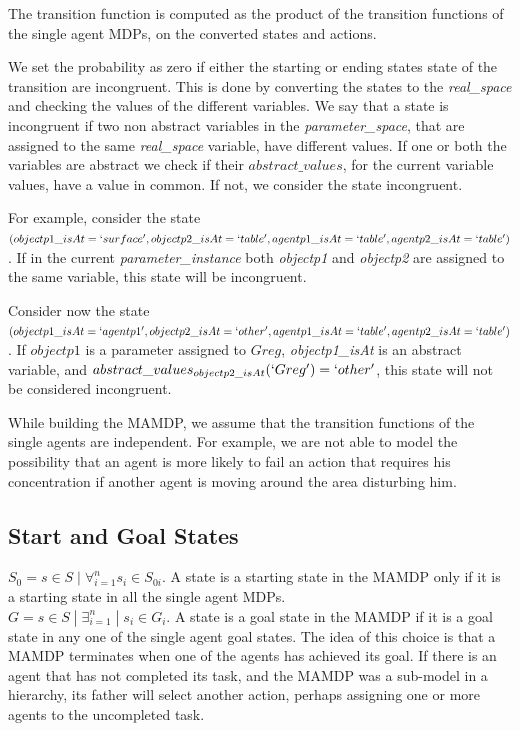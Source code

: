 The transition function is computed as the product of the transition functions of the single agent MDPs, on the converted states and actions.

We set the probability as zero if either the starting or ending states state of the transition are incongruent. This is done by converting the states to the \textit{real\_space} and checking the values of the different variables. We say that a state is incongruent if two non abstract variables in the \textit{parameter\_space}, that are assigned to the same \textit{real\_space} variable, have different values. If one or both the variables are abstract we check if their $abstract\_values$, for the current variable values, have a value in common. If not, we consider the state incongruent.

For example, consider the state $(objectp1\_isAt=`surface', objectp2\_isAt=`table', agentp1\_isAt=`table', agentp2\_isAt=`table')$. If in the current \textit{parameter\_instance} both \textit{objectp1} and \textit{objectp2} are assigned to the same variable, this state will be incongruent.

Consider now the state $(objectp1\_isAt=`agentp1', objectp2\_isAt=`other', agentp1\_isAt=`table', \\ agentp2\_isAt=`table')$. If $objectp1$ is a parameter assigned to $Greg$, \textit{objectp1\_isAt} is an abstract variable, and $abstract\_values_{objectp2\_isAt}(`Greg')=`other'$, this state will not be considered incongruent.  

While building the MAMDP, we assume that the transition functions of the single agents are independent. For example, we are not able to model the possibility that an agent is more likely to fail an action that requires his concentration if another agent is moving around the area disturbing him.

\subsection{Start and Goal States}
$S_0=s \in S\; | \; \forall_{i=1}^n s_i \in S_{0i} $. A state is a starting state in the MAMDP only if it is a starting state in all the single agent MDPs.\\
$G=s \in S\; | \; \exists_{i=1}^n \; | \; s_i \in G_{i}$. A state is a goal state in the MAMDP if it is a goal state in any one of the single agent goal states. The idea of this choice is that a MAMDP terminates when one of the agents has achieved its goal. If there is an agent that has not completed its task, and the MAMDP was a sub-model in a hierarchy, its father will select another action, perhaps assigning one or more agents to the uncompleted task. 

